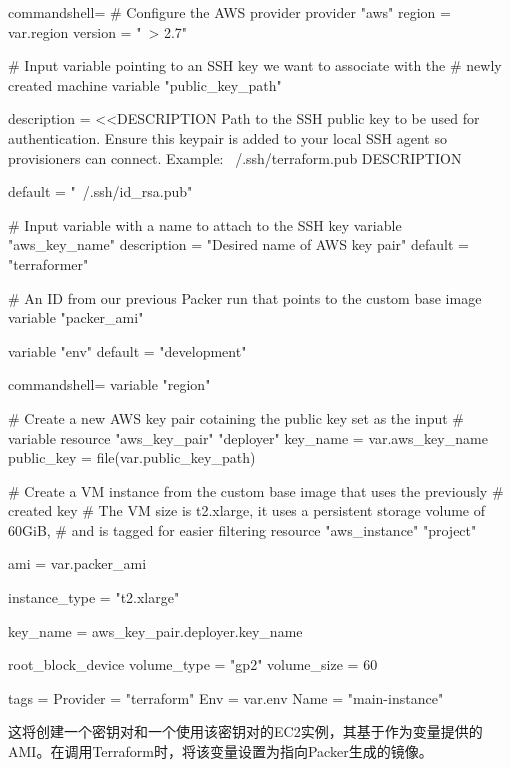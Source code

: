 \begin{tcblisting}{commandshell={}}
# Configure the AWS provider
provider "aws" {
  region = var.region
  version = "~> 2.7"
}

# Input variable pointing to an SSH key we want to associate with the
# newly created machine
variable "public_key_path" {
  description = <<DESCRIPTION
Path to the SSH public key to be used for authentication. 
Ensure this keypair is added to your local SSH agent so 
provisioners can connect.
Example: ~/.ssh/terraform.pub
DESCRIPTION

  default = "~/.ssh/id_rsa.pub"
}

# Input variable with a name to attach to the SSH key
variable "aws_key_name" {
  description = "Desired name of AWS key pair"
  default = "terraformer"
}

# An ID from our previous Packer run that points to the custom base image
variable "packer_ami" {
}

variable "env" {
  default = "development"
}
\end{tcblisting}
\begin{tcblisting}{commandshell={}}
variable "region" {
}

# Create a new AWS key pair cotaining the public key set as the input
# variable
resource "aws_key_pair" "deployer" {
  key_name = var.aws_key_name
  public_key = file(var.public_key_path)
}

# Create a VM instance from the custom base image that uses the previously 
# created key
# The VM size is t2.xlarge, it uses a persistent storage volume of 60GiB,
# and is tagged for easier filtering
resource "aws_instance" "project" {
  ami = var.packer_ami
  
  instance_type = "t2.xlarge"
  
  key_name = aws_key_pair.deployer.key_name
  
  root_block_device {
    volume_type = "gp2"
    volume_size = 60
  }

  tags = {
    Provider = "terraform"
    Env = var.env
    Name = "main-instance"
  }
}
\end{tcblisting}

这将创建一个密钥对和一个使用该密钥对的EC2实例，其基于作为变量提供的AMI。在调用Terraform时，将该变量设置为指向Packer生成的镜像。



